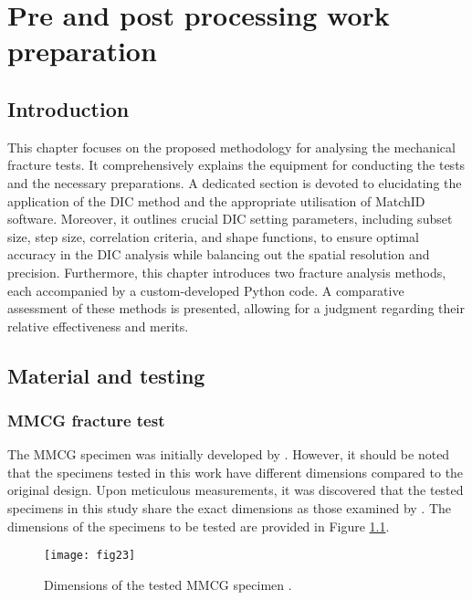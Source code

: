 \chapter{Pre and post processing work preparation}
\label{Chapter2}

\section{Introduction}

This chapter focuses on the proposed methodology for analysing the mechanical fracture tests. It comprehensively explains the equipment for conducting the tests and the necessary preparations. A dedicated section is devoted to elucidating the application of the DIC method and the appropriate utilisation of MatchID software. Moreover, it outlines crucial DIC setting parameters, including subset size, step size, correlation criteria, and shape functions, to ensure optimal accuracy in the DIC analysis while balancing out the spatial resolution and precision.
Furthermore, this chapter introduces two fracture analysis methods, each accompanied by a custom-developed Python code. A comparative assessment of these methods is presented, allowing for a judgment regarding their relative effectiveness and merits.

\section{Material and testing}

\subsection{MMCG fracture test}

The MMCG specimen was initially developed by \citet{MoutouPitti2008}. However, it should be noted that the specimens tested in this work have different dimensions compared to the original design. Upon meticulous measurements, it was discovered that the tested specimens in this study share the exact dimensions as those examined by \citep{Odounga2018phd}. The dimensions of the specimens to be tested are provided in Figure \ref{fig:fig23}.

\begin{figure}[htp]
	\centering
	\texttt{[image: fig23]}
	\caption{Dimensions of the tested MMCG specimen \citep{MoutouPitti2008, Odounga2018phd}.}
	\label{fig:fig23}
\end{figure}

